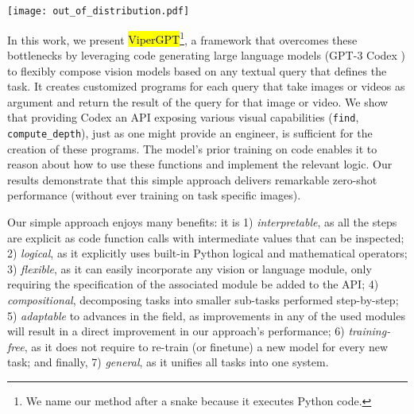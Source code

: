 \documentclass[10pt,twocolumn,letterpaper]{article}
\newcommand{\viper}[0]{{\small\fontfamily{txtt}\selectfont \textcolor{mygreen}{\hl{ViperGPT}}}\xspace}
\begin{document}
\begin{figure*}[p]
    \texttt{[image: out\_of\_distribution.pdf]}
    \caption{\textbf{In-the-wild results.} Given a visual input and a query, \viper synthesizes a program, then executes it with the Python interpreter in order to produce the final answer. This figure shows both the generated code, and the result of intermediate variables during the execution. By composing pretrained modules, \viper obtains answers that are both correct and interpretable for open-world queries.}
    \label{fig:ood}
\end{figure*}

In this work, we present \viper\footnote{We name our method after a snake because it executes Python code.}, a framework that overcomes these bottlenecks by leveraging  code generating large language models (\eg  GPT-3 Codex \cite{chen2021evaluating}) to flexibly compose vision models based on any textual query that defines the task. It creates customized programs for each query that take images or videos as argument and return the result of the query for that image or video. We show that providing Codex an API exposing various visual capabilities (\eg \texttt{find}, \texttt{compute\_depth}), just as one might provide an engineer, is sufficient for the creation of these programs. The model's prior training on code enables it to reason about how to use these functions and implement the relevant logic. Our results demonstrate that this simple approach delivers remarkable zero-shot performance (\ie without ever training on task specific images).


Our simple approach enjoys many benefits: it is 1) \emph{interpretable}, as all the steps are explicit as code function calls with intermediate values that can be inspected; 2) \emph{logical}, as it explicitly uses built-in Python logical and mathematical operators; 
3) \emph{flexible}, as it can easily incorporate any vision or language module, only requiring the specification of the associated module be added to the API; 4) \emph{compositional}, decomposing tasks into smaller sub-tasks performed step-by-step; 5) \emph{adaptable} to advances in the field, as improvements in any of the used modules will result in a direct improvement in our approach's performance; 6) \emph{training-free}, as it does not require to re-train (or finetune) a new model for every new task; and finally, 7) \emph{general}, as it unifies all tasks into one system.
\end{document}
